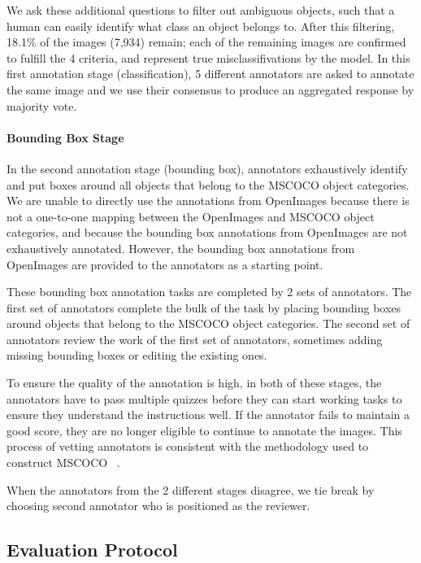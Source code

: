 \documentclass[final]{cvpr}
\begin{document}
We ask these additional questions to filter out ambiguous objects, such that a human can easily identify what class an object belongs to.
After this filtering, 18.1\% of the images (7,934) remain; each of the remaining images are confirmed to fulfill the 4 criteria, and represent true misclassifivations by the model.
In this first annotation stage (classification), 5 different annotators are asked to annotate the same image and we use their consensus to produce an aggregated response by majority vote.

\paragraph{Bounding Box Stage}
In the second annotation stage (bounding box), annotators exhaustively identify and put boxes around all objects that belong to the MSCOCO object categories. We are unable to directly use the annotations from OpenImages because there is not a one-to-one mapping between the OpenImages and MSCOCO object categories, and because the bounding box annotations from OpenImages are not exhaustively annotated. However, the bounding box annotations from OpenImages are provided to the annotators as a starting point.

These bounding box annotation tasks are completed by 2 sets of annotators. The first set of annotators complete the bulk of the task by placing bounding boxes around objects that belong to the MSCOCO object categories. The second set of annotators review the work of the first set of annotators, sometimes adding missing bounding boxes or editing the existing ones.

To ensure the quality of the annotation is high, in both of these stages, the annotators have to pass multiple quizzes before they can start working tasks to ensure they understand the instructions well. If the annotator fails to maintain a good score, they are no longer eligible to continue to annotate the images.  This process of vetting annotators is consistent with the methodology used to construct MSCOCO ~\cite{lin2014microsoft}.

When the annotators from the 2 different stages disagree, we tie break by choosing second annotator who is positioned as the reviewer.





\subsection{Evaluation Protocol}
\end{document}
